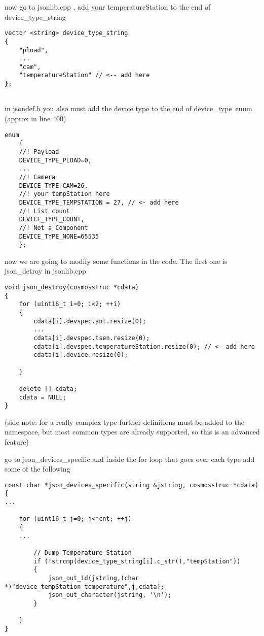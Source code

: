 now go to jsonlib.cpp , add your temperatureStation to the end of device\_type\_string


\begin{lstlisting}
vector <string> device_type_string
{
	"pload",
	...
	"cam",
	"temperatureStation" // <-- add here
};


\end{lstlisting}

in jsondef.h you also must add the device type to the end of device\_type\ enum (approx in line 400)


\begin{lstlisting}
enum
	{
	//! Payload
	DEVICE_TYPE_PLOAD=0,
	...
	//! Camera
	DEVICE_TYPE_CAM=26,
	//! your tempStation here
	DEVICE_TYPE_TEMPSTATION = 27, // <- add here 
	//! List count
	DEVICE_TYPE_COUNT,
	//! Not a Component
	DEVICE_TYPE_NONE=65535
	};

\end{lstlisting}


now we are going to modify some functions in the code. The first one is json\_detroy in jsonlib.cpp


\begin{lstlisting}
void json_destroy(cosmosstruc *cdata)
{
	for (uint16_t i=0; i<2; ++i)
	{
		cdata[i].devspec.ant.resize(0);
		...
		cdata[i].devspec.tsen.resize(0);
		cdata[i].devspec.temperatureStation.resize(0); // <- add here
		cdata[i].device.resize(0);

	}

	delete [] cdata;
	cdata = NULL;
}

\end{lstlisting}

(side note: for a really complex type further definitions must be added to the namespace, but most common types are already supported, so this is an advanced feature)

go to json\_devices\_specific and inside the for loop that goes over each type add some of the following

\begin{lstlisting}
const char *json_devices_specific(string &jstring, cosmosstruc *cdata)
{
...

	for (uint16_t j=0; j<*cnt; ++j)
	{
	...
  
		// Dump Temperature Station
	 	if (!strcmp(device_type_string[i].c_str(),"tempStation"))
	 	{
		 	json_out_1d(jstring,(char *)"device_tempStation_temperature",j,cdata);
	 		json_out_character(jstring, '\n');
	 	}

	} 
}

\end{lstlisting}

